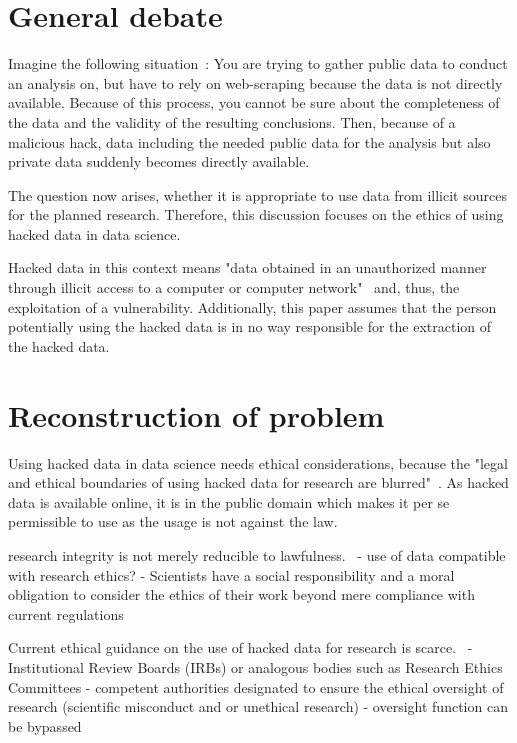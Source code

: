 
\section*{General debate}
Imagine the following situation~\parencite[][1-2]{patreon}:
You are trying to gather public data to conduct an analysis on, but have to rely on web-scraping because the data is not directly available.
Because of this process, you cannot be sure about the completeness of the data and the validity of the resulting conclusions.
Then, because of a malicious hack, data including the needed public data for the analysis but also private data suddenly becomes directly available.

The question now arises, whether it is appropriate to use data from illicit sources for the planned research.
Therefore, this discussion focuses on the ethics of using hacked data in data science.

Hacked data in this context means "data obtained in an unauthorized manner through illicit access to a computer or computer network"~\parencite[][744]{nature} and, thus, the exploitation of a vulnerability.
Additionally, this paper assumes that the person potentially using the hacked data is in no way responsible for the extraction of the hacked data.

\section*{Reconstruction of problem}

Using hacked data in data science needs ethical considerations, because the "legal and ethical boundaries of using hacked data for research are blurred"~\parencite[][745]{nature}.
As hacked data is available online, it is in the public domain which makes it per se permissible to use as the usage is not against the law.

research integrity is not merely reducible to lawfulness.~\parencite[][745]{nature}
- use of data compatible with research ethics?
- Scientists have a social responsibility and
a moral obligation to consider the ethics of their work beyond mere
compliance with current regulations

Current ethical guidance on the use of hacked data for research
is scarce.~\parencite[][745]{nature}
- Institutional Review Boards (IRBs) or analogous bodies such as Research Ethics
Committees
- competent authorities designated to ensure
the ethical oversight of research (scientific misconduct and or unethical research)
- oversight function can be bypassed

